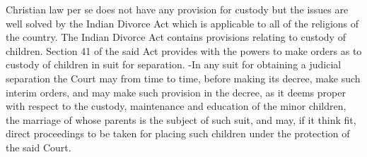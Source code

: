 \begin{multicols}{2}
\noi
Christian law per se does not have any provision for custody but the issues are well solved by the
Indian Divorce Act which is applicable to all of the religions of the country. The Indian Divorce
Act contains provisions relating to custody of children. Section 41 of the said Act provides with
the powers to make orders as to custody of children in suit for separation. -In any suit for obtaining
a judicial separation the Court may from time to time, before making its decree, make such interim
orders, and may make such provision in the decree, as it deems proper with respect to the custody,
maintenance and education of the minor children, the marriage of whose parents is the subject of
such suit, and may, if it think fit, direct proceedings to be taken for placing such children under
the protection of the said Court.


\end{multicols}
